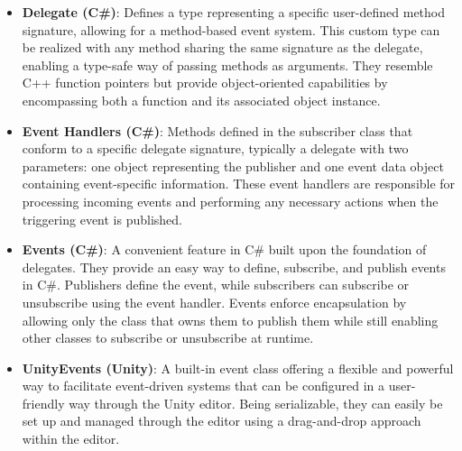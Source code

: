 \begin{itemize}
    \item \textbf{Delegate (C\#)}: Defines a type representing a specific user-defined method signature, allowing for a method-based event system\cite{microsoft-csharp-delegates}. This custom type can be realized with any method sharing the same signature as the delegate, enabling a type-safe way of passing methods as arguments. They resemble C++ function pointers but provide object-oriented capabilities by encompassing both a function and its associated object instance.
    
    \item \textbf{Event Handlers (C\#)}: Methods defined in the subscriber class that conform to a specific delegate signature\cite{microsoft-eventhandler}, typically a delegate with two parameters: one object representing the publisher and one event data object containing event-specific information. These event handlers are responsible for processing incoming events and performing any necessary actions when the triggering event is published.
    
    \item \textbf{Events (C\#)}: A convenient feature in C\# built upon the foundation of delegates\cite{microsoft-csharp-events}. They provide an easy way to define, subscribe, and publish events in C\#. Publishers define the event, while subscribers can subscribe or unsubscribe using the event handler. Events enforce encapsulation by allowing only the class that owns them to publish them while still enabling other classes to subscribe or unsubscribe at runtime.
    
    \item \textbf{UnityEvents (Unity)}: A built-in event class offering a flexible and powerful way to facilitate event-driven systems that can be configured in a user-friendly way through the Unity editor\cite{unity-unityevents}. Being serializable, they can easily be set up and managed through the editor using a drag-and-drop approach within the editor.
\end{itemize}

